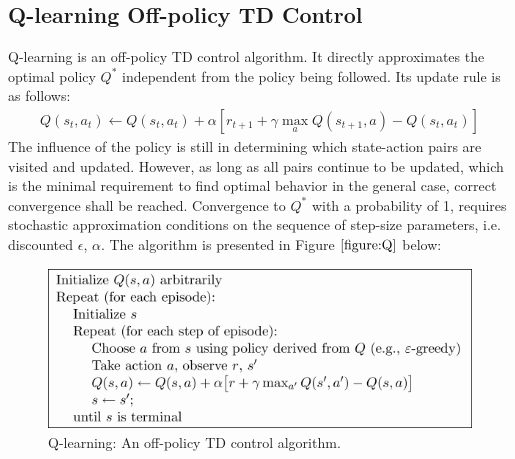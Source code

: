 \documentclass[paper=a4, fontsize=11pt]{scrartcl}
\numberwithin{equation}{section}		%
\numberwithin{figure}{section}			%
\numberwithin{table}{section}				%
\begin{document}
\subsection*{Q-learning Off-policy TD Control}
Q-learning is an off-policy TD control algorithm. It directly approximates the optimal policy $Q^*$ independent from the policy being followed. Its update rule is as follows:
\begin{align}
Q(s_t,a_t) \leftarrow Q(s_t,a_t)+\alpha[r_{t+1}+\gamma \max_a Q(s_{t+1},a)-Q(s_t,a_t)]
\end{align}
The influence of the policy is still in determining which state-action pairs are visited and updated. However, as long as all pairs continue to be updated, which is the minimal requirement to find optimal behavior in the general case, correct convergence shall be reached. Convergence to $Q^*$ with a probability of 1, requires stochastic approximation conditions on the sequence of step-size parameters, i.e. discounted $\epsilon$, $\alpha$. The algorithm is presented in Figure $\ref{figure:Q}$ below:
\begin{figure}[H] \centering
\includegraphics[scale=0.6]{pseudotmp9.png}
\caption{Q-learning: An off-policy TD control algorithm.} \label{figure:Q}
\end{figure}

\end{document}
